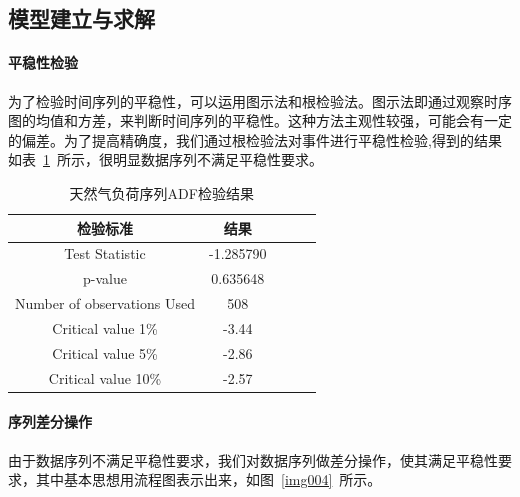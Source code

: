 \documentclass{whutmod}
\begin{document}
	\subsection{模型建立与求解}
	\paragraph{平稳性检验}
	
	为了检验时间序列的平稳性，可以运用图示法和根检验法\parencite{刘罗曼2010时间序列平稳性检验}。图示法即通过观察时序图的均值和方差，来判断时间序列的平稳性。这种方法主观性较强，可能会有一定的偏差。为了提高精确度，我们通过根检验法对事件进行平稳性检验,得到的结果如表~\ref{tab001}~所示，很明显数据序列不满足平稳性要求。
	
	\begin{table}[H]
		\caption{天然气负荷序列ADF检验结果}\label{tab001} \centering
		\begin{tabular}{ccccc}
			\toprule[1.5pt]
			检验标准 & 结果 \\
			\midrule[1pt]
			Test Statistic & -1.285790 \\
			p-value & 0.635648 \\
			Number of observations Used & 508 \\
			Critical value 1\% & -3.44 \\
			Critical value 5\% & -2.86 \\
			Critical value 10\% & -2.57 \\
			\bottomrule[1.5pt]
		\end{tabular}
	\end{table}
	
	\paragraph{序列差分操作}
	由于数据序列不满足平稳性要求，我们对数据序列做差分操作，使其满足平稳性要求，其中基本思想用流程图表示出来，如图~\ref{img004}~所示。
	
\end{document}

